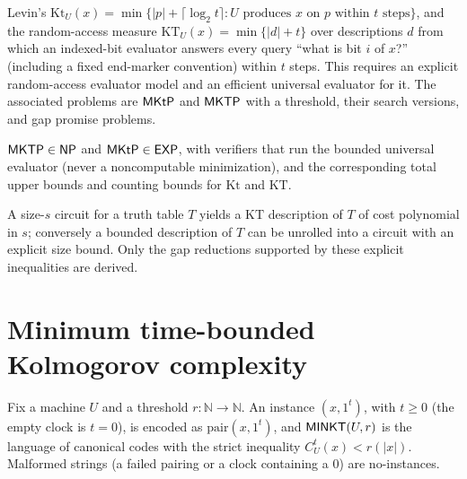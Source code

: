 \begin{definition}
  \label{def:meta-kt}
  \notready
  Levin's $\mathrm{Kt}_U(x) = \min\{|p| + \lceil \log_2 t \rceil : U
  \text{ produces } x \text{ on } p \text{ within } t \text{ steps}\}$, and
  the random-access measure $\mathrm{KT}_U(x) = \min\{|d| + t\}$ over
  descriptions $d$ from which an indexed-bit evaluator answers every query
  ``what is bit $i$ of $x$?'' (including a fixed end-marker convention) within
  $t$ steps. This requires an explicit random-access evaluator model and an
  efficient universal evaluator for it. The associated problems are $\mathsf{MKtP}$
  and $\mathsf{MKTP}$ with a threshold, their search versions, and gap promise
  problems.
\end{definition}

\begin{theorem}
  \label{thm:meta-kt-upper}
  \notready
  $\mathsf{MKTP} \in \mathsf{NP}$ and $\mathsf{MKtP} \in \mathsf{EXP}$, with verifiers that run
  the bounded universal evaluator (never a noncomputable minimization), and
  the corresponding total upper bounds and counting bounds for $\mathrm{Kt}$
  and $\mathrm{KT}$.
\end{theorem}

\begin{theorem}
  \label{thm:meta-circuit-description}
  \notready
  A size-$s$ circuit for a truth table $T$ yields a $\mathrm{KT}$ description of
  $T$ of cost polynomial in $s$; conversely a bounded description of $T$ can be
  unrolled into a circuit with an explicit size bound. Only the gap reductions
  supported by these explicit inequalities are derived.
\end{theorem}

\section{Minimum time-bounded Kolmogorov complexity}

\begin{definition}[$\cc{MINKT}$]
  \label{def:meta-minkt}
  \leanok
  Fix a machine $U$ and a threshold $r \colon \mathbb{N} \to \mathbb{N}$. An
  instance $(x, 1^t)$, with $t \ge 0$ (the empty clock is $t = 0$), is encoded
  as $\mathrm{pair}(x, 1^t)$, and $\mathsf{MINKT}(U, r)$ is the language of
  canonical codes with the strict inequality $C^t_U(x) < r(|x|)$. Malformed
  strings (a failed pairing or a clock containing a $0$) are no-instances.
\end{definition}


